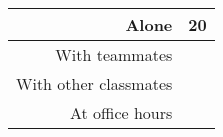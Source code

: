 \documentclass[12pt]{article}
\begin{document}
\begin{tcolorbox}[fit,height=10em, width=40em, blank, borderline={1pt}{1pt},nobeforeafter]
\begin{table}[H]
    \centering
    \begin{tabular}{r|c}
        Alone &  \hspace{3em} 20 %
        \\ \hline
        With teammates & \hspace{3em} %
        \\ \hline
        With other classmates & \hspace{3em} %
        \\ \hline
        At office hours & \hspace{3em} %
        \\ \hline
    \end{tabular}
\end{table}
\end{tcolorbox}
\end{document}
